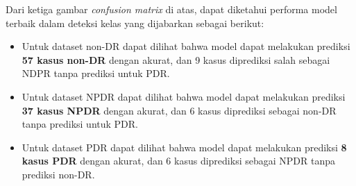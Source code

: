 Dari ketiga gambar \emph{confusion matrix} di atas, dapat diketahui performa model terbaik dalam deteksi kelas yang dijabarkan sebagai berikut:

\begin{itemize}
	\item Untuk dataset non-DR dapat dilihat bahwa model dapat melakukan prediksi \textbf{57 kasus non-DR} dengan akurat, dan 9 kasus diprediksi salah sebagai NDPR tanpa prediksi untuk PDR.
	
	\item Untuk dataset NPDR dapat dilihat bahwa model dapat melakukan prediksi \textbf{37 kasus NPDR} dengan akurat, dan 6 kasus diprediksi sebagai non-DR tanpa prediksi untuk PDR.
	
	\item Untuk dataset PDR dapat dilihat bahwa model dapat melakukan prediksi \textbf{8 kasus PDR} dengan akurat, dan 6 kasus diprediksi sebagai NPDR tanpa prediksi non-DR.
\end{itemize}
\pagebreak

